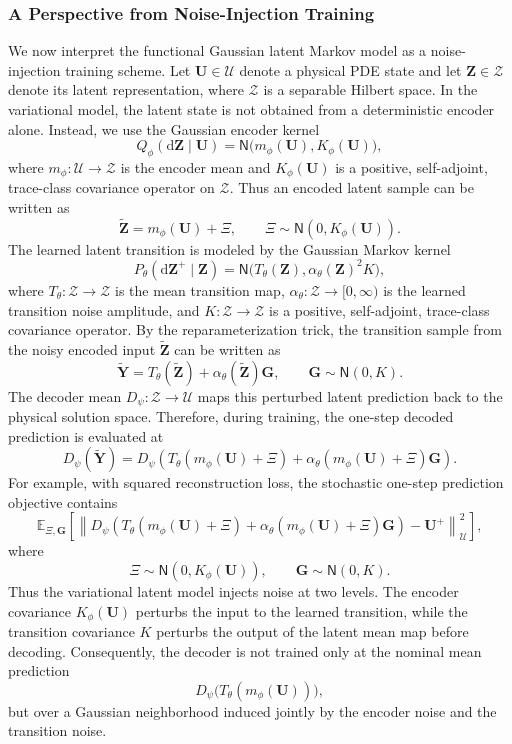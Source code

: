 \documentclass[11pt]{article}
\renewcommand{\d}{\mathrm{d}}
\begin{document}
\subsubsection{A Perspective from Noise-Injection Training}
We now interpret the functional Gaussian latent Markov model as a noise-injection training scheme. Let $\mathbf U\in\mathcal U$ denote a physical PDE state and let $\mathbf Z\in\mathcal Z$ denote its latent representation, where $\mathcal Z$ is a separable Hilbert space. In the variational model, the latent state is not obtained from a deterministic encoder alone. Instead, we use the Gaussian encoder kernel
\[
    Q_\phi(\d \mathbf Z\mid \mathbf U)
    =
    \mathsf N\big(m_\phi(\mathbf U),K_\phi(\mathbf U)\big),
\]
where $m_\phi:\mathcal U\to\mathcal Z$ is the encoder mean and $K_\phi(\mathbf U)$ is a positive,
self-adjoint, trace-class covariance operator on $\mathcal Z$. Thus an encoded latent sample can be
written as
\[
    \widetilde{\mathbf Z}
    =
    m_\phi(\mathbf U)+\Xi,
    \qquad
    \Xi\sim \mathsf N(0,K_\phi(\mathbf U)).
\]
The learned latent transition is modeled by the Gaussian Markov kernel
\[
    P_\theta(\d \mathbf Z^+\mid \mathbf Z)
    =
    \mathsf N\big(T_\theta(\mathbf Z),\alpha_\theta(\mathbf Z)^2K\big),
\]
where $T_\theta:\mathcal Z\to\mathcal Z$ is the mean transition map,
$\alpha_\theta:\mathcal Z\to[0,\infty)$ is the learned transition noise amplitude, and
$K:\mathcal Z\to\mathcal Z$ is a positive, self-adjoint, trace-class covariance operator. By the
reparameterization trick, the transition sample from the noisy encoded input
$\widetilde{\mathbf Z}$ can be written as
\[
    \widetilde{\mathbf Y}
    =
    T_\theta(\widetilde{\mathbf Z})
    +
    \alpha_\theta(\widetilde{\mathbf Z})\mathbf G,
    \qquad
    \mathbf G\sim \mathsf N(0,K).
\]
The decoder mean $D_\psi:\mathcal Z\to\mathcal U$ maps this perturbed latent prediction back to
the physical solution space. Therefore, during training, the one-step decoded prediction is evaluated
at
\[
    D_\psi(\widetilde{\mathbf Y})
    =
    D_\psi\!\left(
    T_\theta(m_\phi(\mathbf U)+\Xi)
    +
    \alpha_\theta(m_\phi(\mathbf U)+\Xi)\mathbf G
    \right).
\]
For example, with squared reconstruction loss, the stochastic one-step prediction objective contains
\[
    \mathbb E_{\Xi,\mathbf G}
    \left[
    \left\|
    D_\psi\!\left(
    T_\theta(m_\phi(\mathbf U)+\Xi)
    +
    \alpha_\theta(m_\phi(\mathbf U)+\Xi)\mathbf G
    \right)
    -
    \mathbf U^+
    \right\|_{\mathcal U}^2
    \right],
\]
where
\[
    \Xi\sim\mathsf N(0,K_\phi(\mathbf U)),
    \qquad
    \mathbf G\sim\mathsf N(0,K).
\]
Thus the variational latent model injects noise at two levels. The encoder covariance $K_\phi(\mathbf U)$ perturbs the input to the learned transition, while the transition covariance $K$ perturbs the output of the latent mean map before decoding. Consequently, the decoder is not trained only at the nominal mean prediction
\[
    D_\psi\big(T_\theta(m_\phi(\mathbf U))\big),
\]
but over a Gaussian neighborhood induced jointly by the encoder noise and the transition noise.
\end{document}
